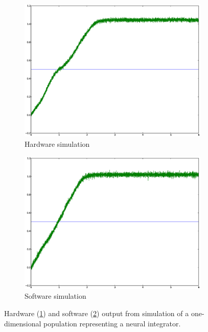 \documentclass[english]{article}
\begin{document}
\begin{figure}[h!]
\centering

\begin{subfigure}[a]{0.4\textwidth}
\includegraphics[width=4in]{integrator-1d.eps}
\caption{Hardware simulation}
\label{fig:integrator1d:hw}
\end{subfigure}

\begin{subfigure}[b]{0.4\textwidth}
\includegraphics[width=4in]{integrator-1d-sw.eps}
\caption{Software simulation}
\label{fig:integrator1d:sw}
\end{subfigure}


\caption[Simulation of a 1D neural integrator.]
{Hardware (\ref{fig:integrator1d:hw}) and software (\ref{fig:integrator1d:sw}) output from simulation of a one-dimensional population representing a neural integrator.}

\label{fig:integrator1d}
\end{figure}
\end{document}
